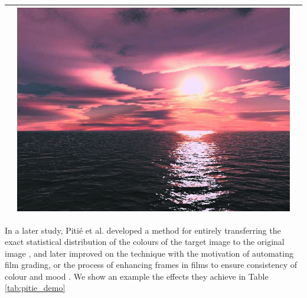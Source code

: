 \begin{table}[H]
\begin{tabular}{|c|c|c|}
\begin{minipage}{.29\textwidth}
  \end{minipage} & 
  \begin{minipage}{.29\textwidth}
    \includegraphics[width=\textwidth,height=\textheight,keepaspectratio]{images/reinhard_result1}
  \end{minipage} \\
    \hline
\end{tabular}
\end{table}

In a later study, Piti\'{e} et al. developed a method for entirely transferring the exact statistical distribution of the colours of the target image to the original image \cite{pitie_2005_pdf}, and later improved on the technique with the motivation of automating film grading, or the process of enhancing frames in films to ensure consistency of colour and mood \cite{pitie_2007_grading}. We show an example the effects they achieve in Table \ref{tab:pitie_demo}

